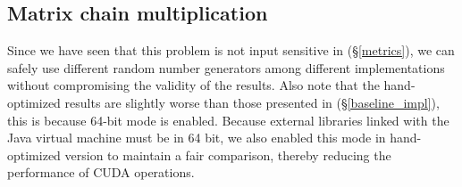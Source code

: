 \newpage
\subsection{Matrix chain multiplication}
Since we have seen that this problem is not input sensitive in (\S\ref{metrics}), we can safely use different random number generators among different implementations without compromising the validity of the results.  Also note that the hand-optimized results are slightly worse than those presented in (\S\ref{baseline_impl}), this is because 64-bit mode is enabled. Because external libraries linked with the Java virtual machine must be in 64 bit, we also enabled this mode in hand-optimized version to maintain a fair comparison, thereby reducing the performance of CUDA operations.


